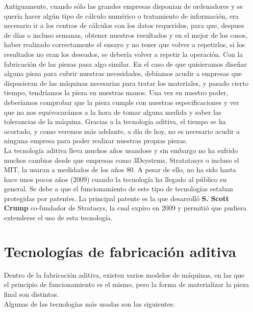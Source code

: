 Antiguamente, cuando sólo las grandes empresas disponian de ordenadores y se quería hacer algún tipo de cálculo numérico o tratamiento de información, era necesario ir a los centros de cálculos con los datos requeridos, para que, despues de días o incluso semanas, obtener nuestros resultados y en el mejor de los casos, haber realizado correctamente el ensayo y no tener que volver a repetirlos, si los resultados no eran los deseados, se debería volver a repetir la operación. Con la fabricación de las piezas pasa algo similar. En el caso de que quisieramos diseñar alguna pieza para cubrir nuestras necesidades, debíamos acudir a empresas que dispusieran de las máquinas necesarias para tratar los materiales, y pasado cierto tiempo, tendríamos la pieza en nuestras manos. Una vez en nuestro poder, deberíamos comprobar que la pieza cumple con nuestras especificaciones y ver que no nos equivocarámos a la hora de tomar alguna medida y saber las tolerancias de la máquina. Gracias a la tecnología aditiva, el tiempo se ha acortado, y como veremos más adelante, a día de hoy, no es necesario acudir a ninguna empresa para poder realizar nuestras propias piezas.\\

La tecnología aditiva lleva muchos años usandose y sin embargo no ha sufrido muchos cambios desde que empresas como 3Dsystems, Stratatasys o incluso el MIT, la usaran a medidados de los años 80. A pesar de ello, no ha sido hasta hace unos pocos años (2009) cuando la tecnología ha llegado al público en general. Se debe a que el funcionamiento de este tipo de tecnologías estaban protegidas por patentes. La principal patente \cite{crump1992apparatus} es la que desarrolló \textbf{S. Scott Crump} co-fundador de Stratasys, la cual expiro en 2009 y permitió que pudiera extenderse el uso de esta tecnología.\\

\section{Tecnologías de fabricación aditiva}

Dentro de la fabricación aditiva, existen varios modelos de máquinas, en las que el principio de funcionamiento es el mismo, pero la forma de materializar la pieza final son distintas.\\

Algunas de las tecnologías más usadas son las siguientes:

